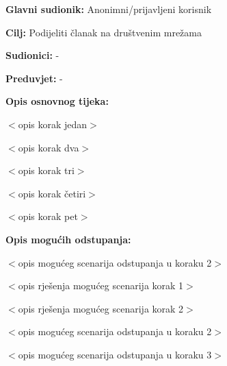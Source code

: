 \noindent {}
\begin{packed_item}

\item \textbf{Glavni sudionik:} Anonimni/prijavljeni korisnik
\item  \textbf{Cilj:} Podijeliti članak na društvenim mrežama
\item  \textbf{Sudionici:} -
\item  \textbf{Preduvjet:} -
\item  \textbf{Opis osnovnog tijeka:}

\item[] \begin{packed_enum}

    \item $<$opis korak jedan$>$
    \item $<$opis korak dva$>$
    \item $<$opis korak tri$>$
    \item $<$opis korak četiri$>$
    \item $<$opis korak pet$>$

\end{packed_enum}

\item  \textbf{Opis mogućih odstupanja:}

\item[] \begin{packed_item}

    \item[2.a] $<$opis mogućeg scenarija odstupanja u koraku 2$>$

    \item[] \begin{packed_enum}

        \item $<$opis rješenja mogućeg scenarija korak 1$>$
        \item $<$opis rješenja mogućeg scenarija korak 2$>$

    \end{packed_enum}

\item[2.b] $<$opis mogućeg scenarija odstupanja u koraku 2$>$
\item[3.a] $<$opis mogućeg scenarija odstupanja  u koraku 3$>$

\end{packed_item}

\end{packed_item}

